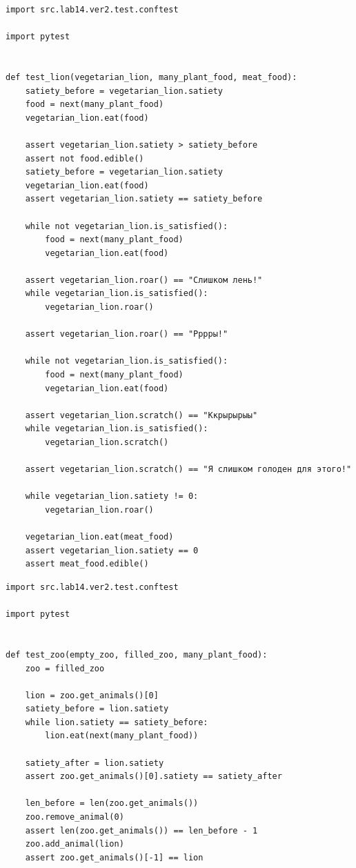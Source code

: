 \documentclass[a4paper,14pt]{extarticle}
\begin{document}
\begin{verbatim}
import src.lab14.ver2.test.conftest

import pytest


def test_lion(vegetarian_lion, many_plant_food, meat_food):
    satiety_before = vegetarian_lion.satiety
    food = next(many_plant_food)
    vegetarian_lion.eat(food)

    assert vegetarian_lion.satiety > satiety_before
    assert not food.edible()
    satiety_before = vegetarian_lion.satiety
    vegetarian_lion.eat(food)
    assert vegetarian_lion.satiety == satiety_before

    while not vegetarian_lion.is_satisfied():
        food = next(many_plant_food)
        vegetarian_lion.eat(food)

    assert vegetarian_lion.roar() == "Слишком лень!"
    while vegetarian_lion.is_satisfied():
        vegetarian_lion.roar()

    assert vegetarian_lion.roar() == "Рррры!"

    while not vegetarian_lion.is_satisfied():
        food = next(many_plant_food)
        vegetarian_lion.eat(food)

    assert vegetarian_lion.scratch() == "Ккрырырыы"
    while vegetarian_lion.is_satisfied():
        vegetarian_lion.scratch()

    assert vegetarian_lion.scratch() == "Я слишком голоден для этого!"

    while vegetarian_lion.satiety != 0:
        vegetarian_lion.roar()

    vegetarian_lion.eat(meat_food)
    assert vegetarian_lion.satiety == 0
    assert meat_food.edible()

\end{verbatim}
\begin{verbatim}
import src.lab14.ver2.test.conftest

import pytest


def test_zoo(empty_zoo, filled_zoo, many_plant_food):
    zoo = filled_zoo

    lion = zoo.get_animals()[0]
    satiety_before = lion.satiety
    while lion.satiety == satiety_before:
        lion.eat(next(many_plant_food))

    satiety_after = lion.satiety
    assert zoo.get_animals()[0].satiety == satiety_after

    len_before = len(zoo.get_animals())
    zoo.remove_animal(0)
    assert len(zoo.get_animals()) == len_before - 1
    zoo.add_animal(lion)
    assert zoo.get_animals()[-1] == lion

\end{verbatim}
\end{document}
